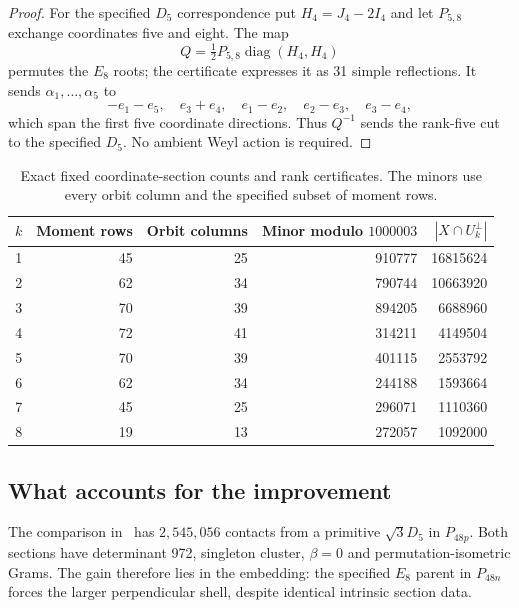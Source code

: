 \begin{proof}
For the specified $D_5$ correspondence put $H_4=J_4-2I_4$ and
let $P_{5,8}$ exchange coordinates five and eight. The map
\[
 Q=\tfrac12P_{5,8}\operatorname{diag}(H_4,H_4)
\]
permutes the $E_8$ roots; the certificate expresses it as 31 simple
reflections.
It sends $\alpha_1,\ldots,\alpha_5$ to
\[
 -e_1-e_5,\quad e_3+e_4,\quad e_1-e_2,\quad
 e_2-e_3,\quad e_3-e_4,
\]
which span the first five coordinate directions. Thus $Q^{-1}$ sends
the rank-five cut to the specified $D_5$. No ambient Weyl action is
required.
\end{proof}

\begin{table}[ht]
\centering
\caption{Exact fixed coordinate-section counts and rank certificates.
The minors use every orbit column and the specified subset of moment rows.}
\label{tab:e8-coordinate-family}
\begin{tabular}{rrrrr}
\toprule
$k$&Moment rows&Orbit columns&Minor modulo $1000003$&$|X\cap U_k^\perp|$\\\midrule
1&45&25&910777&16815624\\
2&62&34&790744&10663920\\
3&70&39&894205&6688960\\
4&72&41&314211&4149504\\
5&70&39&401115&2553792\\
6&62&34&244188&1593664\\
7&45&25&296071&1110360\\
8&19&13&272057&1092000\\\bottomrule
\end{tabular}
\end{table}

\subsection{What accounts for the improvement}
The comparison in~\cite{crosssections} has $2,545,056$ contacts from
a primitive $\sqrt3D_5$ in $P_{48p}$. Both sections have determinant
972, singleton cluster, $\beta=0$ and permutation-isometric Grams.
The gain therefore lies in the embedding: the specified $E_8$ parent
in $P_{48n}$ forces the larger perpendicular shell, despite identical
intrinsic section data.
